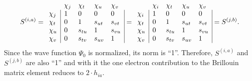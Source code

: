 \begin{equation}
S^{(i,a)}=
\begin{array}{lllll}
 &  \chi_j & \chi_t & \chi_u & \chi_v \\
 \chi_j & \multicolumn{1}{|l}{ 1 } & 0 & 0 & \multicolumn{1}{l|}{ 0 } \\
 \chi_t & \multicolumn{1}{|l}{ 0 } & 1 & s_{ut} & \multicolumn{1}{l|}{ s_{vt} } \\
 \chi_u & \multicolumn{1}{|l}{ 0 } & s_{tu} & 1 & \multicolumn{1}{l|}{s_{vu}} \\
 \chi_v & \multicolumn{1}{|l}{ 0 } & s_{tv} & s_{uv} & \multicolumn{1}{l|}{1}
\end{array}=
\begin{array}{lllll}
 &  \chi_i & \chi_t & \chi_u & \chi_v \\
 \chi_i & \multicolumn{1}{|l}{ 1 } & 0 & 0 & \multicolumn{1}{l|}{ 0 } \\
 \chi_t & \multicolumn{1}{|l}{ 0 } & 1 & s_{ut} & \multicolumn{1}{l|}{ s_{vt} } \\
 \chi_u & \multicolumn{1}{|l}{ 0 } & s_{tu} & 1 & \multicolumn{1}{l|}{s_{vu}} \\
 \chi_v & \multicolumn{1}{|l}{ 0 } & s_{tv} & s_{uv} & \multicolumn{1}{l|}{1}
\end{array}=
S^{(j,b)}.
\end{equation}
Since the wave function $\Psi_0$ is normalized, its norm is ``1''. Therefore, $S^{(i,a)}$ and $S^{(j,b)}$ are also ``1'' and with it the one electron contribution to the Brillouin matrix element reduces to $2 \cdot h_{ia}$.


